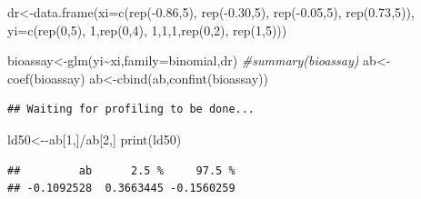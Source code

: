 \documentclass[
]{book}
\newenvironment{Shaded}{\begin{snugshade}}{\end{snugshade}}
\newcommand{\AttributeTok}[1]{\textcolor[rgb]{0.77,0.63,0.00}{#1}}
\newcommand{\CommentTok}[1]{\textcolor[rgb]{0.56,0.35,0.01}{\textit{#1}}}
\newcommand{\DecValTok}[1]{\textcolor[rgb]{0.00,0.00,0.81}{#1}}
\newcommand{\FloatTok}[1]{\textcolor[rgb]{0.00,0.00,0.81}{#1}}
\newcommand{\FunctionTok}[1]{\textcolor[rgb]{0.00,0.00,0.00}{#1}}
\newcommand{\NormalTok}[1]{#1}
\newcommand{\OtherTok}[1]{\textcolor[rgb]{0.56,0.35,0.01}{#1}}
\newcommand{\SpecialCharTok}[1]{\textcolor[rgb]{0.00,0.00,0.00}{#1}}
\newcommand{\StringTok}[1]{\textcolor[rgb]{0.31,0.60,0.02}{#1}}
\theoremstyle{definition}
\theoremstyle{definition}
\theoremstyle{definition}
\theoremstyle{definition}
\theoremstyle{remark}
\begin{document}
\begin{Shaded}
\begin{Highlighting}[]
\NormalTok{ dr}\OtherTok{\textless{}{-}}\FunctionTok{data.frame}\NormalTok{(}\AttributeTok{xi=}\FunctionTok{c}\NormalTok{(}\FunctionTok{rep}\NormalTok{(}\SpecialCharTok{{-}}\FloatTok{0.86}\NormalTok{,}\DecValTok{5}\NormalTok{),}
                     \FunctionTok{rep}\NormalTok{(}\SpecialCharTok{{-}}\FloatTok{0.30}\NormalTok{,}\DecValTok{5}\NormalTok{),}
                     \FunctionTok{rep}\NormalTok{(}\SpecialCharTok{{-}}\FloatTok{0.05}\NormalTok{,}\DecValTok{5}\NormalTok{),}
                     \FunctionTok{rep}\NormalTok{(}\FloatTok{0.73}\NormalTok{,}\DecValTok{5}\NormalTok{)),}
                \AttributeTok{yi=}\FunctionTok{c}\NormalTok{(}\FunctionTok{rep}\NormalTok{(}\DecValTok{0}\NormalTok{,}\DecValTok{5}\NormalTok{),}
                     \DecValTok{1}\NormalTok{,}\FunctionTok{rep}\NormalTok{(}\DecValTok{0}\NormalTok{,}\DecValTok{4}\NormalTok{),}
                     \DecValTok{1}\NormalTok{,}\DecValTok{1}\NormalTok{,}\DecValTok{1}\NormalTok{,}\FunctionTok{rep}\NormalTok{(}\DecValTok{0}\NormalTok{,}\DecValTok{2}\NormalTok{),}
                     \FunctionTok{rep}\NormalTok{(}\DecValTok{1}\NormalTok{,}\DecValTok{5}\NormalTok{)))}

\NormalTok{bioassay}\OtherTok{\textless{}{-}}\FunctionTok{glm}\NormalTok{(yi}\SpecialCharTok{\textasciitilde{}}\NormalTok{xi,}\AttributeTok{family=}\StringTok{\textquotesingle{}binomial\textquotesingle{}}\NormalTok{,dr)}
\CommentTok{\#summary(bioassay)}
\NormalTok{ ab}\OtherTok{\textless{}{-}}\FunctionTok{coef}\NormalTok{(bioassay)}
\NormalTok{ ab}\OtherTok{\textless{}{-}}\FunctionTok{cbind}\NormalTok{(ab,}\FunctionTok{confint}\NormalTok{(bioassay))}
\end{Highlighting}
\end{Shaded}

\begin{verbatim}
## Waiting for profiling to be done...
\end{verbatim}

\begin{Shaded}
\begin{Highlighting}[]
\NormalTok{ ld50}\OtherTok{\textless{}{-}}\SpecialCharTok{{-}}\NormalTok{ab[}\DecValTok{1}\NormalTok{,]}\SpecialCharTok{/}\NormalTok{ab[}\DecValTok{2}\NormalTok{,]}
 \FunctionTok{print}\NormalTok{(ld50)}
\end{Highlighting}
\end{Shaded}

\begin{verbatim}
##         ab      2.5 %     97.5 % 
## -0.1092528  0.3663445 -0.1560259
\end{verbatim}
\end{document}
